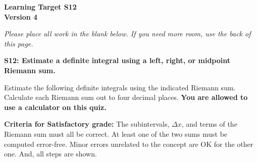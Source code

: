 \documentclass[10pt]{article}
\begin{document}
	\vspace*{0in}

		\begin{center}
			\textbf{Learning Target S12 \\
			Version 4} \\
		\end{center}

\emph{Please place all work in the blank below. If you need more room, use the back of this page.}

\begin{framed}
	\textbf{\textbf{S12:} Estimate a definite integral using a left, right, or midpoint Riemann sum.}
\end{framed}

Estimate the following definite integrals using the indicated Riemann sum. Calculate each Riemann sum out to four decimal places. \textbf{You are allowed to use a calculator on this quiz.}

\begin{enumerate}
    \item $\displaystyle{\int_2^4 \ln(x) \, dx$ using a left Riemann sum with $n = 4$
    \item $\displaystyle{\int_2^6 \ln(x) \, dx$ using a middle Riemann sum with $n = 2$
\end{enumerate}

\vfill


\begin{small}
    \begin{framed}
        	\textbf{Criteria for Satisfactory grade:} The subintervals, $\Delta x$, and terms of the Riemann sum must all be correct. At least one of the two sums must be computed error-free. Minor errors unrelated to the concept are OK for the other one. And, all steps are shown. 
    \end{framed}

\end{small}
\end{document}
